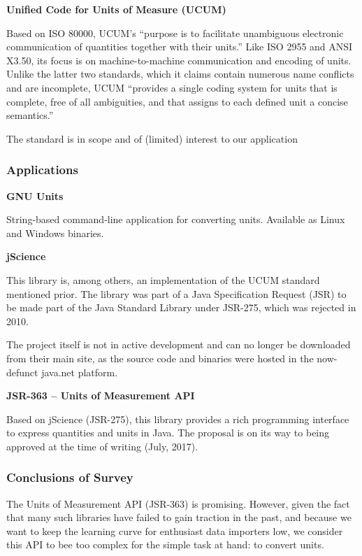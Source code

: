 \textbf{Unified Code for Units of Measure (UCUM)}

Based on ISO 80000, UCUM's ``purpose is to facilitate unambiguous
electronic communication of quantities together with their units.'' Like
ISO 2955 and ANSI X3.50, its focus is on machine-to-machine
communication and encoding of units. Unlike the latter two standards,
which it claims contain numerous name conflicts and are incomplete, UCUM
``provides a single coding system for units that is complete, free of
all ambiguities, and that assigns to each defined unit a concise
semantics.''

The standard is in scope and of (limited) interest to our application

\subsubsection{Applications}\label{applications}

\textbf{GNU Units}

String-based command-line application for converting units. Available as
Linux and Windows binaries.

\textbf{jScience}

This library is, among others, an implementation of the UCUM standard
mentioned prior. The library was part of a Java Specification Request
(JSR) to be made part of the Java Standard Library under JSR-275, which
was rejected in 2010.

The project itself is not in active development and can no longer be
downloaded from their main site, as the source code and binaries were
hosted in the now-defunct java.net platform.

\textbf{JSR-363 -- Units of Measurement API}

Based on jScience (JSR-275), this library provides a rich programming
interface to express quantities and units in Java. The proposal is on
its way to being approved at the time of writing (July, 2017).

\subsubsection{Conclusions of Survey}\label{conclusions-of-survey}

The Units of Measurement API (JSR-363) is promising. However, given the
fact that many such libraries have failed to gain traction in the past,
and because we want to keep the learning curve for enthusiast data
importers low, we consider this API to bee too complex for the simple
task at hand: to convert units.

